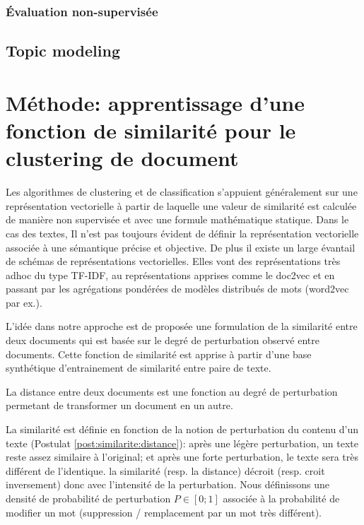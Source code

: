 \subsubsection{Évaluation non-supervisée}

\subsection{Topic modeling}


\section{Méthode: apprentissage d'une fonction de similarité pour le clustering de document}
Les algorithmes de clustering et de classification s'appuient généralement sur une représentation vectorielle à partir de laquelle une valeur de similarité est calculée de manière non supervisée et avec une formule mathématique statique. Dans le cas des textes, Il n'est pas toujours évident de définir la représentation vectorielle associée à une sémantique précise et objective. De plus il existe un large évantail de schémas de représentations vectorielles. Elles vont des représentations très adhoc du type TF-IDF, au représentations apprises comme le doc2vec et en passant par les agrégations pondérées de modèles distribués de mots (word2vec par ex.). 

L'idée dans notre approche est de proposée une formulation de la similarité entre deux documents qui est basée sur le degré de perturbation observé entre documents. Cette fonction de similarité est apprise à partir d'une base synthétique d'entrainement de similarité entre paire de texte. 
\begin{postulat}
La distance entre deux documents est une fonction au degré de perturbation permetant de transformer un document en un autre. \label{post:similarite:distance}
\end{postulat}
La similarité est définie en fonction de la notion de perturbation du contenu d'un texte (Postulat \ref{post:similarite:distance}): après une légère perturbation, un texte reste assez similaire à l'original; et après une forte perturbation, le texte sera très différent de l'identique. la similarité (resp. la distance) décroit (resp. croit inversement) donc avec l'intensité de la perturbation. Nous définissons une densité de probabilité de perturbation $P \in [0; 1]$ associée à la probabilité de modifier un mot (suppression / remplacement par un mot très différent). 

